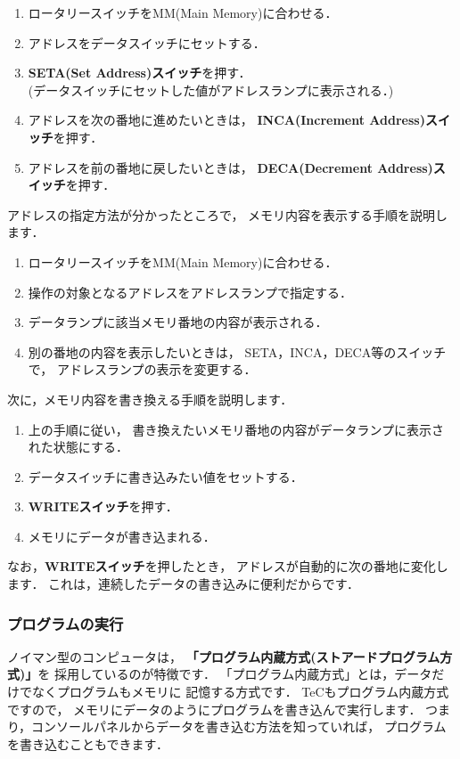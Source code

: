 \begin{enumerate}
\item ロータリースイッチをMM(Main Memory)に合わせる．
\item アドレスをデータスイッチにセットする．
\item {\bf SETA(Set Address)スイッチ}を押す．\\
(データスイッチにセットした値がアドレスランプに表示される．)
\item アドレスを次の番地に進めたいときは，
{\bf INCA(Increment Address)スイッチ}を押す．
\item アドレスを前の番地に戻したいときは，
{\bf DECA(Decrement Address)スイッチ}を押す．
\end{enumerate}

アドレスの指定方法が分かったところで，
メモリ内容を表示する手順を説明します．

\begin{enumerate}
\item ロータリースイッチをMM(Main Memory)に合わせる．
\item 操作の対象となるアドレスをアドレスランプで指定する．
\item データランプに該当メモリ番地の内容が表示される．
\item 別の番地の内容を表示したいときは，
SETA，INCA，DECA等のスイッチで，
アドレスランプの表示を変更する．
\end{enumerate}

次に，メモリ内容を書き換える手順を説明します．

\begin{enumerate}
\item 上の手順に従い，
書き換えたいメモリ番地の内容がデータランプに表示された状態にする．
\item データスイッチに書き込みたい値をセットする．
\item {\bf WRITEスイッチ}を押す．
\item メモリにデータが書き込まれる．
\end{enumerate}

なお，{\bf WRITEスイッチ}を押したとき，
アドレスが自動的に次の番地に変化します．
これは，連続したデータの書き込みに便利だからです．

\subsubsection{プログラムの実行}
ノイマン型のコンピュータは，
{\bf 「プログラム内蔵方式(ストアードプログラム方式)」}を
採用しているのが特徴です．
「プログラム内蔵方式」とは，データだけでなくプログラムもメモリに
記憶する方式です．
TeCもプログラム内蔵方式ですので，
メモリにデータのようにプログラムを書き込んで実行します．
つまり，コンソールパネルからデータを書き込む方法を知っていれば，
プログラムを書き込むこともできます．

